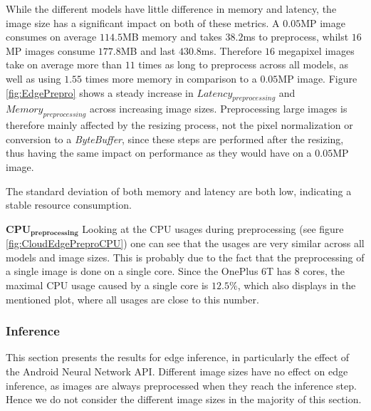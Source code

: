 While the different models have little difference in memory and latency, the image size has a significant impact on both of these metrics.
A $0.05$MP image consumes on average $114.5$MB memory and takes $38.2$ms to preprocess, whilst  $16$MP images consume $177.8$MB and last $430.8$ms.
Therefore $16$ megapixel images take on average more than $11$ times as long to preprocess across all models, as well as using $1.55$ times more memory in comparison to a $0.05$MP image.
Figure \ref{fig:EdgePrepro} shows a steady increase in $Latency_{preprocessing}$ and $Memory_{preprocessing}$ across increasing image sizes.
Preprocessing large images is therefore mainly affected by the resizing process, not the pixel normalization or conversion to a \emph{ByteBuffer}, since these steps are performed after the resizing, thus having the same impact on performance as they would have on a $0.05$MP image.

The standard deviation of both memory and latency are both low, indicating a stable resource consumption.




$\mathbf{CPU_{preprocessing}}$
Looking at the CPU usages during preprocessing (see figure \ref{fig:CloudEdgePreproCPU}) one can see that the usages are very similar across all models and image sizes. This is probably due to the fact that the preprocessing of a single image is done on a single core. Since the OnePlus 6T has $8$ cores, the maximal CPU usage caused by a single core is $12.5\%$, which also displays in the mentioned plot, where all usages are close to this number.

\FloatBarrier
\subsubsection{Inference}
This section presents the results for edge inference, in particularly the effect of the Android Neural Network API.
Different image sizes have no effect on edge inference, as images are always preprocessed when they reach the inference step.
Hence we do not consider the different image sizes in the majority of this section.


